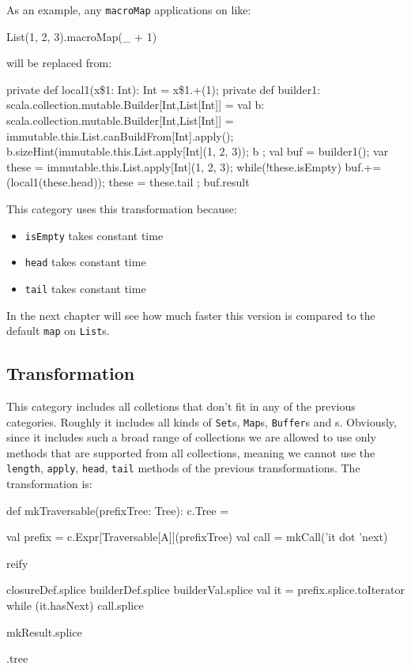 As an example, any
\texttt{macroMap} applications on  like:

\begin{scalaCode}
List(1, 2, 3).macroMap(\_ + 1)
\end{scalaCode}

will be replaced from:

\begin{scalaCode}
{
  private def local1(x\$1: Int): Int = x\$1.+(1);
  private def builder1: scala.collection.mutable.Builder[Int,List[Int]] = {
    val b: scala.collection.mutable.Builder[Int,List[Int]] =
immutable.this.List.canBuildFrom[Int].apply();
    b.sizeHint(immutable.this.List.apply[Int](1, 2, 3));
    b
  };
  val buf = builder1();
  var these = immutable.this.List.apply[Int](1, 2, 3);
  while(!these.isEmpty){
    buf.+=(local1(these.head));
    these = these.tail
  };
  buf.result
}
\end{scalaCode}

This category uses this transformation because:
\begin{itemize}
 \item
  \texttt{isEmpty} takes constant time
 \item
  \texttt{head} takes constant time
 \item
  \texttt{tail} takes constant time
\end{itemize}

In the next chapter will see how much faster this version is compared to the
default \texttt{map} on \texttt{List}s.

\subsection{ Transformation}

This category includes all colletions that don't fit in any of the previous
categories. Roughly it includes all kinds of \texttt{Set}s, \texttt{Map}s, \texttt{Buffer}s and
s. Obviously, since it includes such a broad range of
collections we are allowed to use only methods that are supported from all
collections, meaning we cannot use the \texttt{length}, \texttt{apply}, \texttt{head}, \texttt{tail} methods of the
previous transformations. The transformation is: 

\begin{scalaCode}
 def mkTraversable(prefixTree: Tree): c.Tree = {
  val prefix = c.Expr[Traversable[A]](prefixTree)
  val call   = mkCall('it dot 'next)

  reify {
    closureDef.splice
    builderDef.splice
    builderVal.splice
    val it = prefix.splice.toIterator
    while (it.hasNext)
      call.splice

    mkResult.splice
  }.tree
}
\end{scalaCode}


